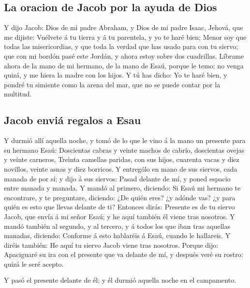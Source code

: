 \hypertarget{la-oracion-de-jacob-por-la-ayuda-de-dios}{%
\subsection{La oracion de Jacob por la ayuda de
Dios}\label{la-oracion-de-jacob-por-la-ayuda-de-dios}}

 Y dijo Jacob: Dios de mi padre Abraham, y Dios de mi
padre Isaac, Jehová, que me dijiste: Vuélvete á tu tierra y á tu
parentela, y yo te haré bien;  Menor soy que todas las
misericordias, y que toda la verdad que has usado para con tu siervo;
que con mi bordón pasé este Jordán, y ahora estoy sobre dos cuadrillas.
 Líbrame ahora de la mano de mi hermano, de la mano de
Esaú, porque le temo; no venga quizá, y me hiera la madre con los hijos.
 Y tú has dicho: Yo te haré bien, y pondré tu simiente
como la arena del mar, que no se puede contar por la multitud.

\hypertarget{jacob-enviuxe1-regalos-a-esau}{%
\subsection{Jacob enviá regalos a
Esau}\label{jacob-enviuxe1-regalos-a-esau}}

 Y durmió allí aquella noche, y tomó de lo que le vino á
la mano un presente para su hermano Esaú:  Doscientas
cabras y veinte machos de cabrío, doscientas ovejas y veinte carneros,
 Treinta camellas paridas, con sus hijos, cuarenta vacas
y diez novillos, veinte asnas y diez borricos.  Y
entrególo en mano de sus siervos, cada manada de por sí; y dijo á sus
siervos: Pasad delante de mí, y poned espacio entre manada y manada.
 Y mandó al primero, diciendo: Si Esaú mi hermano te
encontrare, y te preguntare, diciendo: ¿De quién eres? ¿y adónde vas? ¿y
para quién es esto que llevas delante de ti?  Entonces
dirás: Presente es de tu siervo Jacob, que envía á mi señor Esaú; y he
aquí también él viene tras nosotros.  Y mandó también al
segundo, y al tercero, y á todos los que iban tras aquellas manadas,
diciendo: Conforme á esto hablaréis á Esaú, cuando le hallareis.
 Y diréis también: He aquí tu siervo Jacob viene tras
nosotros. Porque dijo: Apaciguaré su ira con el presente que va delante
de mí, y después veré su rostro: quizá le seré acepto.

 Y pasó el presente delante de él; y él durmió aquella
noche en el campamento.

